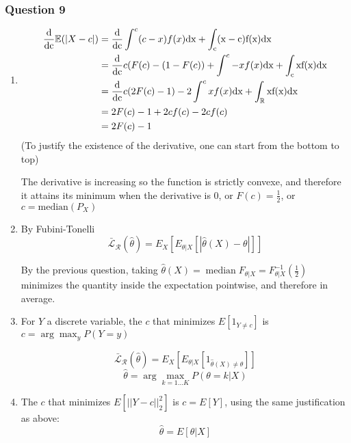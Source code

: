 \documentclass[12pt]{article}
\newcommand{\Q}[1]{\subsubsection*{Question #1}}
\newcommand{\Es}[1]{\mathbb{E}(#1)}
\begin{document}
\Q{9}
\begin{enumerate}
\item 

\begin{align*}
\frac{\rm d}{\rm d c} \Es {|X-c|} &= \frac{\rm d}{\rm d c} \int^c (c-x)f(x) \rm{dx} + \int_c (x-c)f(x) \rm{dx} 
\\&= \frac{\rm d}{\rm d c} c (F(c) - (1-F(c)) + \int^c -xf(x) \rm{dx} + \int_c x f(x) \rm{dx}
\\&= \frac{\rm d}{\rm d c} c (2F(c) - 1) - 2 \int^c xf(x) \rm{dx} + \int_{\mathbb{R}} x f(x) \rm{dx}
\\&= 2F(c)-1 + 2cf(c) - 2 cf(c) 
\\&= 2F(c)-1
\end{align*}
(To justify the existence of the derivative, one can start from the bottom to top)

The derivative is increasing so the function is strictly convexe, and therefore it attains its minimum when the derivative is 0, or $F(c) = \frac12$, or $c = \text{median}(P_X)$ 

\item 


By Fubini-Tonelli
$$\bar {\mathcal L}_{\mathcal R} (\hat \theta) = E_X[ E_{\theta|X}[|\hat \theta(X) - \theta|] ]$$

By the previous question, taking  $\hat \theta(X) = \operatorname{median}F_{\theta|X} = F_{\theta|X}^{-1}(\frac12)$ minimizes the quantity inside the expectation pointwise, and therefore in average.



\item 
For $Y$ a discrete variable, the $c$ that minimizes $E[1_{Y \neq c}]$ is $c = \arg \max_y P(Y = y)$

$$\bar {\mathcal L}_{\mathcal R} (\hat \theta) = E_X[ E_{\theta|X}[1_{\hat \theta(X) \neq \theta}] ]$$
$$\hat \theta = \arg \max_{k=1...K} P(\theta = k | X)$$

\item The $c$ that minimizes $E[||Y - c||_2^2]$ is $c = E[Y]$, using the same justification as above:
$$\hat \theta = E[\theta | X]$$
\end{enumerate}
\end{document}
